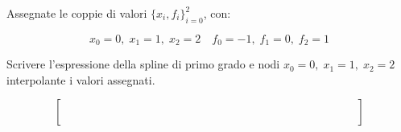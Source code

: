 Assegnate le coppie di valori $\{x_i,f_i \}_{i=0}^2$, con:

\[ x_0=0, \; x_1=1, \; x_2=2 \quad f_0=-1, \; f_1=0, \; f_2=1 \] 

\noindent Scrivere l'espressione della spline di primo grado e 
nodi $x_0=0, \; x_1=1, \; x_2=2$ interpolante i valori assegnati.

\[
\left [
\begin{array}{cccccccccccccc}
 \quad &  \quad & \quad &  \quad &  \quad &  \quad &  \quad  \quad & \quad &  \quad & \quad &  \quad & \quad & \quad &  \quad  \\
 \quad & \quad & \quad &  \quad &  \quad &  \quad &  \quad  \quad & \quad &  \quad & \quad &  \quad & \quad & \quad &  \quad \\
 \quad & \quad & \quad &  \quad &  \quad &  \quad &  \quad  \quad & \quad &  \quad & \quad &  \quad & \quad & \quad &  \quad\\
   \quad &  \quad & \quad &  \quad &  \quad &  \quad &  \quad  \quad & \quad &  \quad & \quad &  \quad & \quad & \quad &  \quad  \\
  \quad &  \quad & \quad &  \quad &  \quad &  \quad &  \quad  \quad & \quad &  \quad & \quad &  \quad & \quad & \quad &  \quad  
\end{array}\right]
\]
